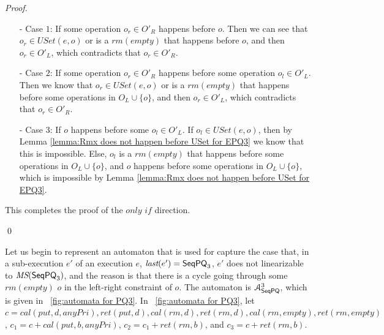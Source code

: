 \begin {proof}
\begin{itemize}
\setlength{\itemsep}{0.5pt}
\item[-] Case $1$: If some operation $o_r \in O'_R$ happens before $o$. Then we can see that $o_r \in \textit{USet}(e,o)$ or is a $\textit{rm}(\textit{empty})$ that happens before $o$, and then $o_r \in O'_L$, which contradicts that $o_r \in O'_R$.

\item[-] Case $2$: If some operation $o_r \in O'_R$ happens before some operation $o_l \in O'_L$. Then we know that $o_r \in \textit{USet}(e,o)$ or is a $\textit{rm}(\textit{empty})$ that happens before some operations in $O_L \cup \{ o \}$, and then $o_r \in O'_L$, which contradicts that $o_r \in O'_R$.

\item[-] Case $3$: If $o$ happens before some $o_l \in O'_L$. If $o_l \in \textit{USet}(e,o)$, then by Lemma \ref{lemma:Rmx does not happen before USet for EPQ3} we know that this is impossible. Else, $o_l$ is a $\textit{rm}(\textit{empty})$ that happens before some operations in $O_L \cup \{ o \}$, and $o$ happens before some operations in $O_L \cup \{ o \}$, which is impossible by Lemma \ref{lemma:Rmx does not happen before USet for EPQ3}.
\end{itemize}

This completes the proof of the $\textit{only if}$ direction.

\qed
\end {proof}

Let us begin to represent an automaton that is used for capture the case that, in a sub-execution $e'$ of an execution $e$, $\textit{last}(e')=\mathsf{SeqPQ}_3$, $e'$ does not linearizable to $\textit{MS}(\mathsf{SeqPQ}_3)$, and the reason is that there is a cycle going through some $\textit{rm}(\textit{empty})$ $o$ in the left-right constraint of $o$. The automaton is $\mathcal{A}_{\mathsf{SeqPQ}}^3$, which is given in \figurename~\ref{fig:automata for PQ3}. In \figurename~\ref{fig:automata for PQ3}, let $c = \textit{cal}(\textit{put},d,\textit{anyPri}),\textit{ret}(\textit{put},d), \textit{cal}(\textit{rm},d), \textit{ret}(\textit{rm},d),\textit{cal}(\textit{rm},\textit{empty}),\textit{ret}(\textit{rm},\textit{empty})$, $c_1 = c + \textit{cal}(\textit{put},b,\textit{anyPri})$, $c_2 = c_1 + \textit{ret}(\textit{rm},b)$, and $c_3 = c + \textit{ret}(\textit{rm},b)$.

